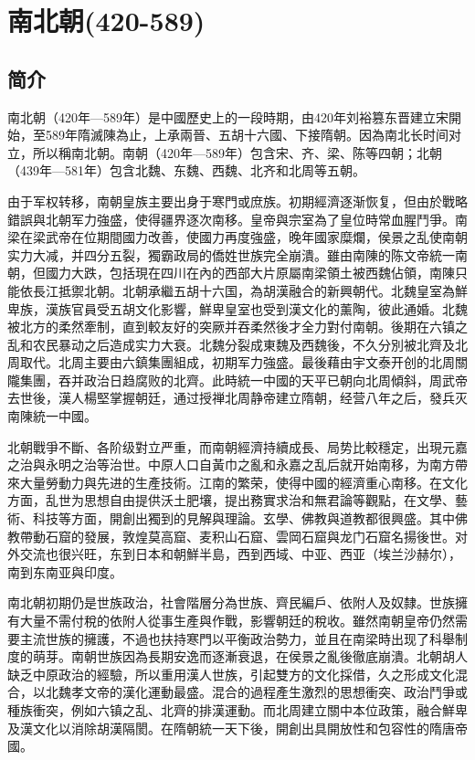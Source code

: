 
\chapter{南北朝\tiny(420-589)}

\section{简介}

南北朝（420年—589年）是中國歷史上的一段時期，由420年刘裕篡东晋建立宋開始，至589年隋滅陳為止，上承兩晉、五胡十六國、下接隋朝。因為南北长时间对立，所以稱南北朝。南朝（420年—589年）包含宋、齐、梁、陈等四朝；北朝（439年—581年）包含北魏、东魏、西魏、北齐和北周等五朝。

由于军权转移，南朝皇族主要出身于寒門或庶族。初期經濟逐渐恢复，但由於戰略錯誤與北朝军力強盛，使得疆界逐次南移。皇帝與宗室為了皇位時常血腥鬥爭。南梁在梁武帝在位期間國力改善，使國力再度強盛，晚年國家糜爛，侯景之乱使南朝实力大减，并四分五裂，獨霸政局的僑姓世族完全崩潰。雖由南陳的陈文帝統一南朝，但國力大跌，包括現在四川在內的西部大片原屬南梁領土被西魏佔領，南陳只能依長江抵禦北朝。北朝承繼五胡十六国，為胡漢融合的新興朝代。北魏皇室為鮮卑族，漢族官員受五胡文化影響，鮮卑皇室也受到漢文化的薰陶，彼此通婚。北魏被北方的柔然牽制，直到較友好的突厥并吞柔然後才全力對付南朝。後期在六镇之乱和农民暴动之后造成实力大衰。北魏分裂成東魏及西魏後，不久分別被北齊及北周取代。北周主要由六鎮集團組成，初期军力強盛。最後藉由宇文泰开创的北周關隴集團，吞并政治日趋腐败的北齊。此時統一中國的天平已朝向北周傾斜，周武帝去世後，漢人楊堅掌握朝廷，通过授禅北周静帝建立隋朝，经营八年之后，發兵灭南陳統一中國。

北朝戰爭不斷、各阶级對立严重，而南朝經濟持續成長、局势比較穩定，出現元嘉之治與永明之治等治世。中原人口自黃巾之亂和永嘉之乱后就开始南移，为南方帶來大量勞動力與先进的生產技術。江南的繁荣，使得中國的經濟重心南移。在文化方面，乱世为思想自由提供沃土肥壤，提出務實求治和無君論等觀點，在文學、藝術、科技等方面，開創出獨到的見解與理論。玄學、佛教與道教都很興盛。其中佛教帶動石窟的發展，敦煌莫高窟、麦积山石窟、雲岡石窟與龙门石窟名揚後世。对外交流也很兴旺，东到日本和朝鮮半島，西到西域、中亚、西亚（埃兰沙赫尔），南到东南亚與印度。

南北朝初期仍是世族政治，社會階層分為世族、齊民編戶、依附人及奴隸。世族擁有大量不需付稅的依附人從事生產與作戰，影響朝廷的稅收。雖然南朝皇帝仍然需要主流世族的擁護，不過也扶持寒門以平衡政治勢力，並且在南梁時出现了科舉制度的萌芽。南朝世族因為長期安逸而逐漸衰退，在侯景之亂後徹底崩潰。北朝胡人缺乏中原政治的經驗，所以重用漢人世族，引起雙方的文化採借，久之形成文化混合，以北魏孝文帝的漢化運動最盛。混合的過程產生激烈的思想衝突、政治鬥爭或種族衝突，例如六镇之乱、北齊的排漢運動。而北周建立關中本位政策，融合鮮卑及漢文化以消除胡漢隔閡。在隋朝統一天下後，開創出具開放性和包容性的隋唐帝國。

